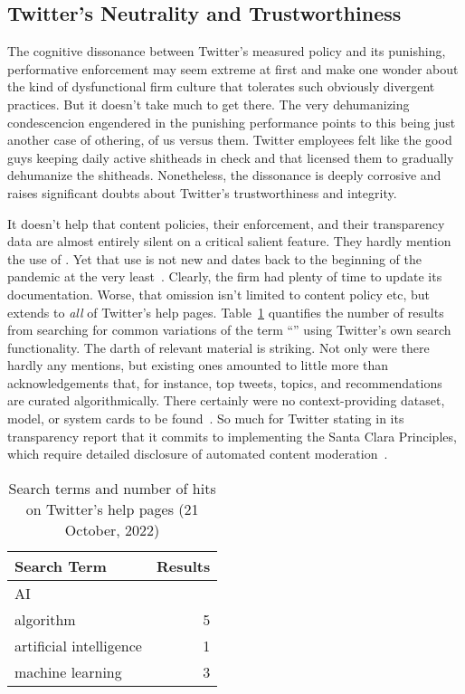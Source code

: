 \subsection{Twitter's Neutrality and Trustworthiness}
\label{sec:trusting-twitter}

The cognitive dissonance between Twitter's measured policy and its punishing,
performative enforcement may seem extreme at first and make one wonder about the
kind of dysfunctional firm culture that tolerates such obviously divergent
practices. But it doesn't take much to get there. The very dehumanizing
condescencion engendered in the punishing performance points to this being just
another case of othering, of us versus them. Twitter employees felt like the
good guys keeping daily active shitheads in check and that licensed them to
gradually dehumanize the shitheads. Nonetheless, the dissonance is deeply
corrosive and raises significant doubts about Twitter's trustworthiness and
integrity.

It doesn't help that content policies, their enforcement, and their transparency
data are almost entirely silent on a critical salient feature. They hardly
mention the use of . Yet that use is not new and dates back to the
beginning of the pandemic at the very least~\cite{ScottKayali2020}. Clearly, the
firm had plenty of time to update its documentation. Worse, that omission isn't
limited to content policy etc, but extends to \emph{all} of Twitter's help
pages. Table~\ref{table:search} quantifies the number of results from searching
for common variations of the term ``'' using Twitter's own search
functionality. The darth of relevant material is striking. Not only were there
hardly any mentions, but existing ones amounted to little more than
acknowledgements that, for instance, top tweets, topics, and recommendations are
curated algorithmically. There certainly were no context-providing dataset,
model, or system cards to be
found~\cite{GebruMorgensternea2021,MitchellWuea2019,ProcopeCheemaea2022}. So
much for Twitter stating in its transparency report that it commits to
implementing the Santa Clara Principles, which require detailed disclosure of
automated content
moderation~\cite{AccessNowACLUFoundationOfNorthernCaliforniaea2021}.

\begin{table}
\caption{Search terms and number of hits on Twitter's help pages (21 October, 2022)}
\label{table:search}
\begin{tabular}{lr}
\textbf{Search Term} & \textbf{Results} \B \\ \hline
AI & \T0 \\
algorithm & 5 \\
artificial intelligence & 1 \\
machine learning & 3 \\
\end{tabular}
\end{table}

